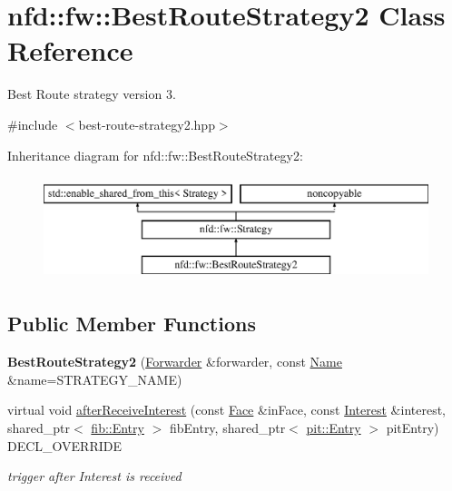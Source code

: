 \hypertarget{classnfd_1_1fw_1_1BestRouteStrategy2}{}\section{nfd\+:\+:fw\+:\+:Best\+Route\+Strategy2 Class Reference}
\label{classnfd_1_1fw_1_1BestRouteStrategy2}


Best Route strategy version 3.  




{\ttfamily \#include $<$best-\/route-\/strategy2.\+hpp$>$}

Inheritance diagram for nfd\+:\+:fw\+:\+:Best\+Route\+Strategy2\+:\begin{figure}[H]
\begin{center}
\leavevmode
\includegraphics[height=3.000000cm]{classnfd_1_1fw_1_1BestRouteStrategy2}
\end{center}
\end{figure}
\subsection*{Public Member Functions}
\begin{DoxyCompactItemize}
\item 
{\bfseries Best\+Route\+Strategy2} (\hyperlink{classnfd_1_1Forwarder}{Forwarder} \&forwarder, const \hyperlink{classndn_1_1Name}{Name} \&name=S\+T\+R\+A\+T\+E\+G\+Y\+\_\+\+N\+A\+ME)\hypertarget{classnfd_1_1fw_1_1BestRouteStrategy2_a7bdeb151c9290274b76e921c4103b635}{}\label{classnfd_1_1fw_1_1BestRouteStrategy2_a7bdeb151c9290274b76e921c4103b635}

\item 
virtual void \hyperlink{classnfd_1_1fw_1_1BestRouteStrategy2_a54c18bf6a066cac59b1edd5ddcfd2c19}{after\+Receive\+Interest} (const \hyperlink{classnfd_1_1Face}{Face} \&in\+Face, const \hyperlink{classndn_1_1Interest}{Interest} \&interest, shared\+\_\+ptr$<$ \hyperlink{classnfd_1_1fib_1_1Entry}{fib\+::\+Entry} $>$ fib\+Entry, shared\+\_\+ptr$<$ \hyperlink{classnfd_1_1pit_1_1Entry}{pit\+::\+Entry} $>$ pit\+Entry) D\+E\+C\+L\+\_\+\+O\+V\+E\+R\+R\+I\+DE
\begin{DoxyCompactList}\small\item\em trigger after Interest is received \end{DoxyCompactList}\end{DoxyCompactItemize}
